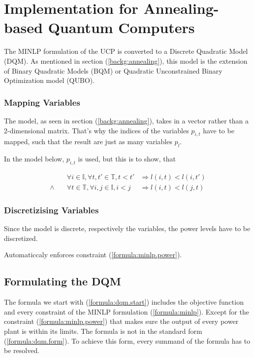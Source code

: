 \section{Implementation for Annealing-based Quantum Computers}

The MINLP formulation of the UCP is converted to a Discrete Quadratic Model (DQM).
As mentioned in section (\ref{backg:annealing}), this model is the extension
of Binary Quadratic Models (BQM) or Quadratic Unconstrained Binary Optimization model (QUBO).

\subsubsection{Mapping Variables}

The model, as seen in section (\ref{backg:annealing}), takes in a vector rather than a 2-dimensional matrix.
That's why the indices of the variables $p_{i,t}$ have to be mapped, such that the result are just as many variables $p_{l}$.


In the model below, $p_{i,t}$ is used, but this is to show, that

\begin{subequations}
\begin{align}
  &
  \forall i \in \mathbb{I}, \forall t, t' \in \mathbb{T}, t < t'
  &
  \Rightarrow l(i, t) < l(i, t')
  \\
  \land \quad
  &
  \forall t \in \mathbb{T}, \forall i, j \in \mathbb{I}, i < j
  &
  \Rightarrow l(i, t) < l(j, t)
\end{align}
\end{subequations}

\subsubsection{Discretizising Variables}

Since the model is discrete, respectively the variables, the power levels have to be discretized.


Automaticcaly enforces constraint (\ref{formula:minlp.power}).

\subsection{Formulating the DQM}

The formula we start with (\ref{formula:dqm.start}) includes the objective function and every constraint of the MINLP formulation (\ref{formula:minlp}).
Except for the constraint (\ref{formula:minlp.power}) that makes sure the output of every power plant is within its limits.
The formula is not in the standard form (\ref{formula:dqm.form}).
To achieve this form, every summand of the formula has to be resolved.

